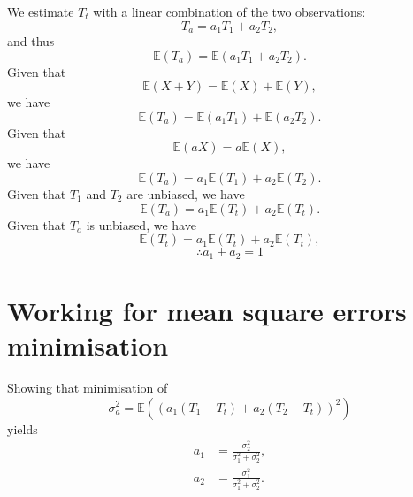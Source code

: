 We estimate $T_t$ with a linear combination of the two observations:
\begin{equation}
    T_a = a_1 T_1 + a_2 T_2,
\end{equation}
and thus
\begin{equation}
    \mathbb{E}(T_a) = \mathbb{E}(a_1 T_1 + a_2 T_2).
\end{equation}
Given that
\begin{equation}
    \mathbb{E}(X + Y) = \mathbb{E}(X) + \mathbb{E}(Y),
\end{equation}
we have
\begin{equation}
    \mathbb{E}(T_a) = \mathbb{E}(a_1 T_1) + \mathbb{E}(a_2 T_2).
\end{equation}
Given that
\begin{equation}
    \mathbb{E}(aX) = a \mathbb{E}(X),
\end{equation}
we have
\begin{equation}
    \mathbb{E}(T_a) = a_1 \mathbb{E}(T_1) + a_2 \mathbb{E}(T_2).
\end{equation}
Given that $T_1$ and $T_2$ are unbiased, we have
\begin{equation}
    \mathbb{E}(T_a) = a_1 \mathbb{E}(T_t) + a_2 \mathbb{E}(T_t).
\end{equation}
Given that $T_a$ is unbiased, we have
\begin{equation*}
    \mathbb{E}(T_t) = a_1 \mathbb{E}(T_t) + a_2 \mathbb{E}(T_t),
\end{equation*}
\begin{equation}
    \therefore a_1 + a_2 = 1 \label{eq:coeff_constraints}
\end{equation}

\section{Working for mean square errors minimisation}
\label{sub:kalnay_working:mse}

Showing that minimisation of 
\begin{equation}
\sigma_a^2 = \mathbb{E} \left( \left( a_1(T_1 - T_t) + a_2(T_2 - T_t) \right)^2 \right)
\end{equation}
yields
\begin{subequations}
    \begin{align}
    a_1 &= \frac{\sigma_2^2}{\sigma_1^2 + \sigma_2^2}, \\
    a_2 &= \frac{\sigma_1^2}{\sigma_1^2 + \sigma_2^2}.
    \end{align}
\end{subequations}        

